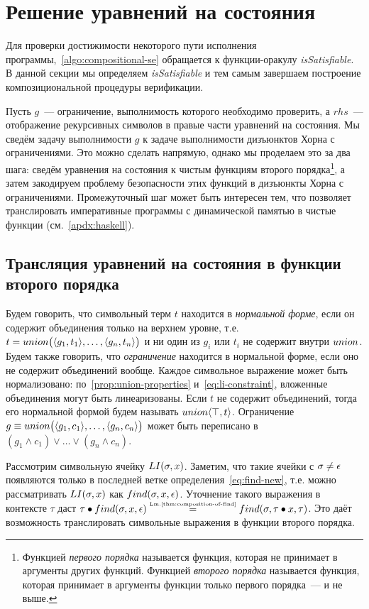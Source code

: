 \section{Решение уравнений на состояния}
\label{sec:encoding}
Для проверки достижимости некоторого пути исполнения программы,~\autoref{algo:compositional-se} обращается к функции-оракулу \emph{isSatisfiable}. В данной секции мы определяем \emph{isSatisfiable} и тем самым завершаем построение композициональной процедуры верификации.

Пусть $g$~--- ограничение, выполнимость которого необходимо проверить, а $rhs$~--- отображение рекурсивных символов в правые части уравнений на состояния. Мы сведём задачу выполнимости $g$ к задаче выполнимости дизъюнктов Хорна с ограничениями. Это можно сделать напрямую, однако мы проделаем это за два шага: сведём уравнения на состояния к чистым функциям второго порядка\footnote{Функцией \emph{первого порядка} называется функция, которая не принимает в аргументы других функций. Функцией \emph{второго порядка} называется функция, которая принимает в аргументы функции только первого порядка~--- и не выше.}, а затем закодируем проблему безопасности этих функций в дизъюнкты Хорна с ограничениями. Промежуточный шаг может быть интересен тем, что позволяет транслировать императивные программы с динамической памятью в чистые функции (см.~\autoref{apdx:haskell}).

\subsection{Трансляция уравнений на состояния в функции второго порядка}
Будем говорить, что символьный терм $t$ находится в \emph{нормальной форме}, если он содержит объединения только на верхнем уровне, т.е. $t=union\big(\langle g_1, t_1\rangle,\ldots,\langle g_n, t_n\rangle\big)$ и ни один из $g_i$ или $t_i$ не содержит внутри $union$. Будем также говорить, что \emph{ограничение} находится в нормальной форме, если оно не содержит объединений вообще. Каждое символьное выражение может быть нормализовано: по~\autoref{prop:union-properties} и~\eqref{eq:li-constraint}, вложенные объединения могут быть линеаризованы. Если $t$ не содержит объединений, тогда его нормальной формой будем называть $union\langle\top, t\rangle$. Ограничение $g \equiv union\big(\langle g_1, c_1\rangle,\ldots,\langle g_n, c_n\rangle\big)$ может быть переписано в $(g_1\wedge c_1) \vee \ldots \vee (g_n\wedge c_n)$.

Рассмотрим символьную ячейку $LI(\sigma, x)$. Заметим, что такие ячейки с $\sigma\neq\epsilon$ появляются только в последней ветке определения~\eqref{eq:find-new}, т.е. можно рассматривать $LI(\sigma, x)$ как $find(\sigma,x,\epsilon)$. Уточнение такого выражения в контексте $\tau$ даст $\tau\bullet find(\sigma,x,\epsilon)\mathrel{\stackrel{\mbox{\normalfont\tiny Lm.\ref{thm:composition-of-find}}}{=}}find(\sigma,\tau\bullet x,\tau)$. Это даёт возможность транслировать символьные выражения в функции второго порядка.

